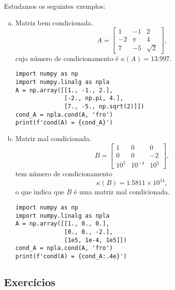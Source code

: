 \begin{ex}\label{ex:kappa}
  Estudamos os seguintes exemplos:
  \begin{enumerate}[a)]
  \item Matriz bem condicionada.
    \begin{equation}
      A =
      \begin{bmatrix}
        1 & -1 & 2\\
        -2 & \pi & 4\\
        7 & -5 & \sqrt{2}
      \end{bmatrix},
    \end{equation}
    cujo número de condicionamento é $\kappa(A) = 13.997$.

    \begin{lstlisting}
import numpy as np
import numpy.linalg as npla
A = np.array([[1., -1., 2.],
              [-2., np.pi, 4.],
              [7., -5., np.sqrt(2)]])
cond_A = npla.cond(A, 'fro')
print(f'cond(A) = {cond_A}')
\end{lstlisting}

  \item Matriz mal condicionada.
    \begin{equation}
      B =
      \begin{bmatrix}
        1 & 0 & 0\\
        0 & 0 & -2\\
        10^{5} & 10^{-4} & 10^{5}
      \end{bmatrix},    
    \end{equation}
    tem número de condicionamento
    \begin{equation}
      \kappa(B) = 1.5811\times 10^{14},
    \end{equation}
    o que indica que $B$ é uma matriz mal condicionada.

    \begin{lstlisting}
import numpy as np
import numpy.linalg as npla
A = np.array([[1., 0., 0.],
              [0., 0., -2.],
              [1e5, 1e-4, 1e5]])
cond_A = npla.cond(A, 'fro')
print(f'cond(A) = {cond_A:.4e}')
\end{lstlisting}

  \end{enumerate}
\end{ex}

\subsection{Exercícios}

